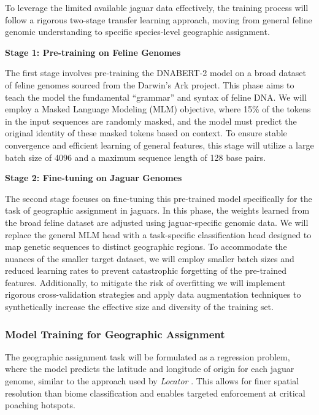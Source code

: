 To leverage the limited available jaguar data effectively, the training process will follow a rigorous two-stage transfer learning approach, moving from general feline genomic understanding to specific species-level geographic assignment.

\textbf{Stage 1: Pre-training on Feline Genomes}

The first stage involves pre-training the DNABERT-2 model on a broad dataset of feline genomes sourced from the Darwin's Ark project. This phase aims to teach the model the fundamental ``grammar'' and syntax of feline DNA. We will employ a Masked Language Modeling (MLM) objective, where 15\% of the tokens in the input sequences are randomly masked, and the model must predict the original identity of these masked tokens based on context. To ensure stable convergence and efficient learning of general features, this stage will utilize a large batch size of 4096 and a maximum sequence length of 128 base pairs.

\textbf{Stage 2: Fine-tuning on Jaguar Genomes}

The second stage focuses on fine-tuning this pre-trained model specifically for the task of geographic assignment in jaguars. In this phase, the weights learned from the broad feline dataset are adjusted using jaguar-specific genomic data. We will replace the general MLM head with a task-specific classification head designed to map genetic sequences to distinct geographic regions. To accommodate the nuances of the smaller target dataset, we will employ smaller batch sizes and reduced learning rates to prevent catastrophic forgetting of the pre-trained features. Additionally, to mitigate the risk of overfitting we will implement rigorous cross-validation strategies and apply data augmentation techniques to synthetically increase the effective size and diversity of the training set.

\subsubsection{Model Training for Geographic Assignment}

The geographic assignment task will be formulated as a regression problem, where the model predicts the latitude and longitude of origin for each jaguar genome, similar to the approach used by \textit{Locator} \cite{battey2020predicting}. This allows for finer spatial resolution than biome classification and enables targeted enforcement at critical poaching hotspots.

